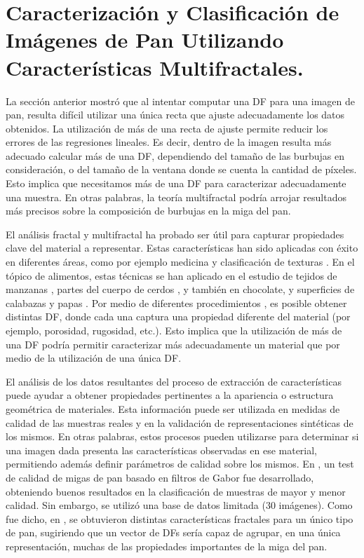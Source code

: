 \section[Características Multifractales del pan]{Caracterización y Clasificación de Imágenes de Pan Utilizando Características Multifractales.}

La sección anterior mostró que al intentar computar una DF para una imagen de pan, resulta difícil utilizar una única recta que ajuste adecuadamente los datos obtenidos.
La utilización de más de una recta de ajuste permite reducir los errores de las regresiones lineales.
Es decir, dentro de la imagen resulta más adecuado calcular más de una DF, dependiendo del tamaño de las burbujas en consideración, o del tamaño de la ventana donde se cuenta la cantidad de píxeles.
Esto implica que necesitamos más de una DF para caracterizar adecuadamente una muestra.
En otras palabras, la teoría multifractal podría arrojar resultados más precisos sobre la composición de burbujas en la miga del pan.

El análisis fractal y multifractal ha probado ser útil para capturar propiedades clave del material a representar.
Estas características han sido aplicadas con éxito en diferentes áreas, como por ejemplo medicina \cite{Andjelkovic2008,Yu2011} y clasificación de texturas \cite{Wendt2009}.
En el tópico de alimentos, estas técnicas se han aplicado en el estudio de tejidos de manzanas \cite{Mendoza2010}, partes del cuerpo de cerdos \cite{Serrano2012}, y también en chocolate, y superficies de calabazas y papas \cite{Quevedo2002}.
Por medio de diferentes procedimientos \cite{Gonzales2008,Peitgen2004}, es posible obtener distintas DF, donde cada una captura una propiedad diferente del material (por ejemplo, porosidad, rugosidad, etc.).
Esto implica que la utilización de más de una DF podría permitir caracterizar más adecuadamente un material que por medio de la utilización de una única DF.

El análisis de los datos resultantes del proceso de extracción de características puede ayudar a obtener propiedades pertinentes a la apariencia o estructura geométrica de materiales.
Esta información puede ser utilizada en medidas de calidad de las muestras reales y en la validación de representaciones sintéticas de los mismos.
En otras palabras, estos procesos pueden utilizarse para determinar si una imagen dada presenta las características observadas en ese material, permitiendo además definir parámetros de calidad sobre los mismos.
En \cite{Fan2006}, un test de calidad de migas de pan basado en filtros de Gabor fue desarrollado, obteniendo buenos resultados en la clasificación de muestras de mayor y menor calidad.
Sin embargo, se utilizó una base de datos limitada ($30$ imágenes).
Como fue dicho, en \cite{Gonzales2008}, se obtuvieron distintas características fractales para un único tipo de pan, sugiriendo que un vector de DFs sería capaz de agrupar, en una única representación, muchas de las propiedades importantes de la miga del pan.

